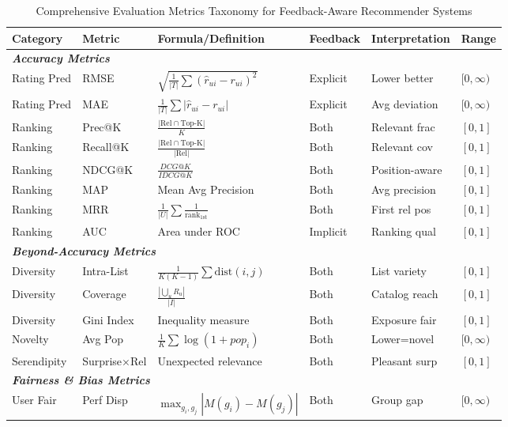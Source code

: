 \begin{table*}[ht]
\centering
\caption{Comprehensive Evaluation Metrics Taxonomy for Feedback-Aware Recommender Systems}
\label{tab:metrics_taxonomy}
\tiny
\begin{tabular}{@{}p{2cm}p{2.2cm}p{2.8cm}p{1.4cm}p{2.4cm}p{1.1cm}@{}}
\toprule
\textbf{Category} & \textbf{Metric} & \textbf{Formula/Definition} & \textbf{Feedback} & \textbf{Interpretation} & \textbf{Range} \\
\midrule
\multicolumn{6}{l}{\textit{\textbf{Accuracy Metrics}}} \\
\midrule
Rating Pred & RMSE & $\sqrt{\frac{1}{|T|}\sum(\hat{r}_{ui} - r_{ui})^2}$ & Explicit & Lower better & $[0, \infty)$ \\
Rating Pred & MAE & $\frac{1}{|T|}\sum|\hat{r}_{ui} - r_{ui}|$ & Explicit & Avg deviation & $[0, \infty)$ \\
Ranking & Prec@K & $\frac{|\text{Rel} \cap \text{Top-K}|}{K}$ & Both & Relevant frac & $[0, 1]$ \\
Ranking & Recall@K & $\frac{|\text{Rel} \cap \text{Top-K}|}{|\text{Rel}|}$ & Both & Relevant cov & $[0, 1]$ \\
Ranking & NDCG@K & $\frac{DCG@K}{IDCG@K}$ & Both & Position-aware & $[0, 1]$ \\
Ranking & MAP & Mean Avg Precision & Both & Avg precision & $[0, 1]$ \\
Ranking & MRR & $\frac{1}{|U|}\sum\frac{1}{\text{rank}_{\text{1st}}}$ & Both & First rel pos & $[0, 1]$ \\
Ranking & AUC & Area under ROC & Implicit & Ranking qual & $[0, 1]$ \\
\midrule
\multicolumn{6}{l}{\textit{\textbf{Beyond-Accuracy Metrics}}} \\
\midrule
Diversity & Intra-List & $\frac{1}{K(K-1)}\sum \text{dist}(i,j)$ & Both & List variety & $[0, 1]$ \\
Diversity & Coverage & $\frac{|\bigcup_u R_u|}{|I|}$ & Both & Catalog reach & $[0, 1]$ \\
Diversity & Gini Index & Inequality measure & Both & Exposure fair & $[0, 1]$ \\
Novelty & Avg Pop & $\frac{1}{K}\sum \log(1 + pop_i)$ & Both & Lower=novel & $[0, \infty)$ \\
Serendipity & Surprise×Rel & Unexpected relevance & Both & Pleasant surp & $[0, 1]$ \\
\midrule
\multicolumn{6}{l}{\textit{\textbf{Fairness \& Bias Metrics}}} \\
\midrule
User Fair & Perf Disp & $\max_{g_i,g_j} |M(g_i) - M(g_j)|$ & Both & Group gap & $[0, \infty)$ \\

\end{tabular}
\end{table*}
